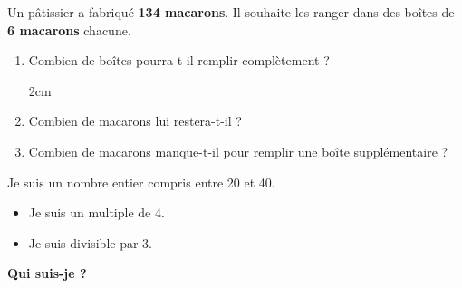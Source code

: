 \documentclass[a4paper]{book}
\begin{document}
    \begin{exercice}
        Un pâtissier a fabriqué \textbf{134 macarons}. Il souhaite les ranger dans des boîtes de \textbf{6 macarons} chacune.

        \medskip
        
        \begin{minipage}{0.47\linewidth}
            \begin{enumerate}[leftmargin=*]
                \item Combien de boîtes pourra-t-il remplir complètement ? 

                \begin{ZoneReponse}{2cm}
                \end{ZoneReponse}
            \end{enumerate}
        \end{minipage}
        \hfill \vline \hfill
        \begin{minipage}{0.48\linewidth}
            \begin{enumerate}[leftmargin=*]
                \setcounter{enumi}{1}
                \item Combien de macarons lui restera-t-il ? 
                
                \dotfill
                
                \item Combien de macarons manque-t-il pour remplir une boîte supplémentaire ? 
                
                \dotfill
            \end{enumerate}
        \end{minipage}
    \end{exercice}

    
    \begin{exercice}
        Je suis un nombre entier compris entre 20 et 40.
        \begin{itemize}
            \item Je suis un multiple de 4.
            \item Je suis divisible par 3.
        \end{itemize}

        \textbf{Qui suis-je ?}
    \end{exercice}
    
\end{document}

